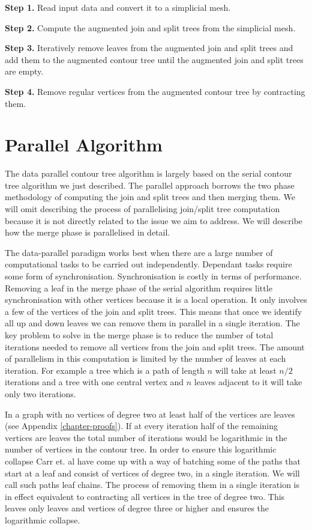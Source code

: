 \textbf{Step 1.} Read input data and convert it to a simplicial mesh.

\textbf{Step 2.} Compute the augmented join and split trees from the simplicial mesh.

\textbf{Step 3.} Iteratively remove leaves from the augmented join and split trees and add them to the augmented contour tree until the augmented join and split trees are empty.

\textbf{Step 4.} Remove regular vertices from the augmented contour tree by contracting them.

\section{Parallel Algorithm}

The data parallel contour tree algorithm \cite{parallel-peak-pruning} is largely based on the serial contour tree algorithm we just described. The parallel approach borrows the two phase methodology of computing the join and split trees and then merging them. We will omit describing the process of parallelising join/split tree computation because it is not directly related to the issue we aim to address. We will describe how the merge phase is parallelised in detail.

The data-parallel paradigm works best when there are a large number of computational tasks to be carried out independently. Dependant tasks require some form of synchronisation. Synchronisation is costly in terms of performance. Removing a leaf in the merge phase of the serial algorithm requires little synchronisation with other vertices because it is a local operation. It only involves a few of the vertices of the join and split trees. This means that once we identify all up and down leaves we can remove them in parallel in a single iteration. The key problem to solve in the merge phase is to reduce the number of total iterations needed to remove all vertices from the join and split trees. The amount of parallelism in this computation is limited by the number of leaves at each iteration. For example a tree which is a path of length $n$ will take at least $n/2$ iterations and a tree with one central vertex and $n$ leaves adjacent to it will take only two iterations.

In a graph with no vertices of degree two at least half of the vertices are leaves (see Appendix \ref{chapter-proofs}). If at every iteration half of the remaining vertices are leaves the total number of iterations would be logarithmic in the number of vertices in the contour tree. In order to ensure this logarithmic collapse Carr et. al \cite{parallel-peak-pruning} have come up with a way of batching some of the paths that start at a leaf and consist of vertices of degree two, in a single iteration. We will call such paths leaf chains. The process of removing them in a single iteration is in effect equivalent to contracting all vertices in the tree of degree two. This leaves only leaves and vertices of degree three or higher and ensures the logarithmic collapse.

